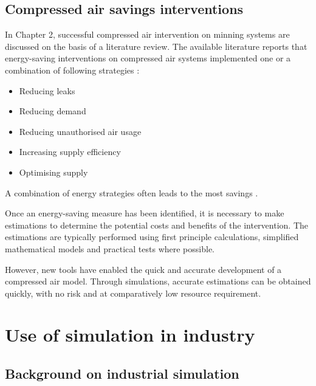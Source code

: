 	\subsection{Compressed air savings interventions}
		In Chapter 2, successful compressed air intervention on minning systems are discussed on the basis of a literature review. The available literature reports that energy-saving interventions on compressed air systems implemented one or a combination of following strategies \cite{Snyman2011Masters}:
		\begin{itemize}
			\item Reducing leaks
			\item Reducing demand
			\item Reducing unauthorised air usage
			\item Increasing supply efficiency
			\item Optimising supply
		\end{itemize}
	 A combination of energy strategies often leads to the most savings \cite{Marais2012PhD}. 
	 \par 
	 Once an energy-saving measure has been identified, it is necessary to make estimations to determine the potential costs and benefits of the intervention. The estimations are typically performed using first principle calculations, simplified mathematical models and practical tests where possible. 
	 \par 
	 However, new tools have enabled the quick and accurate development of a compressed air model. Through simulations, accurate estimations can be obtained quickly, with no risk and at comparatively low resource requirement.
\section{Use of simulation in industry }
	\subsection{Background on industrial simulation}
	
